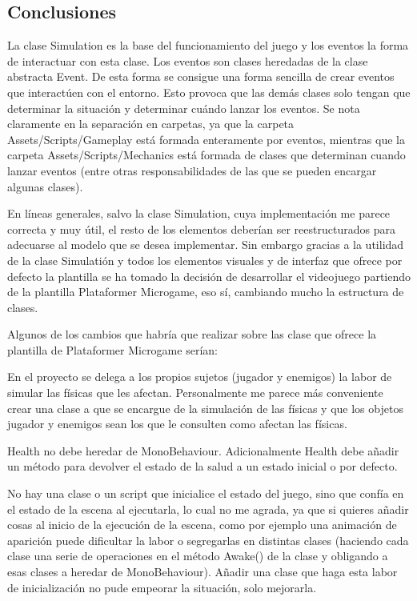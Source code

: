 \subsection{Conclusiones}
La clase Simulation es la base del funcionamiento del juego y los eventos la forma de interactuar con esta clase. Los eventos son clases heredadas de la clase abstracta Event. De esta forma se consigue una forma sencilla de crear eventos que interactúen con el entorno. Esto provoca que las demás clases solo tengan que determinar la situación y determinar cuándo lanzar los eventos. Se nota claramente en la separación en carpetas, ya que la carpeta Assets/Scripts/Gameplay está formada enteramente por eventos, mientras que la carpeta Assets/Scripts/Mechanics está formada de clases que determinan cuando lanzar eventos (entre otras responsabilidades de las que se pueden encargar algunas clases).

En líneas generales, salvo la clase Simulation, cuya implementación me parece correcta y muy útil, el resto de los elementos deberían ser reestructurados para adecuarse al modelo que se desea implementar. Sin embargo gracias a la utilidad de la clase Simulatión y todos los elementos visuales y de interfaz que ofrece por defecto la plantilla se ha tomado la decisión de desarrollar el videojuego partiendo de la plantilla Plataformer Microgame, eso sí, cambiando mucho la estructura de clases.

Algunos de los cambios que habría que realizar sobre las clase que ofrece la plantilla de Plataformer Microgame serían:

En el proyecto se delega a los propios sujetos (jugador y enemigos) la labor de simular las físicas que les afectan. Personalmente me parece más conveniente crear una clase a que se encargue de la simulación de las físicas y que los objetos jugador y enemigos sean los que le consulten como afectan las físicas. 

Health no debe heredar de MonoBehaviour. Adicionalmente Health debe añadir un método para devolver el estado de la salud a un estado inicial o por defecto. 

No hay una clase o un script que inicialice el estado del juego, sino que confía en el estado de la escena al ejecutarla, lo cual no me agrada, ya que si quieres añadir cosas al inicio de la ejecución de la escena, como por ejemplo una animación de aparición puede dificultar la labor o segregarlas en distintas clases (haciendo cada clase una serie de operaciones en el método Awake() de la clase y obligando a esas clases a heredar de MonoBehaviour). Añadir una clase que haga esta labor de inicialización no pude empeorar la situación, solo mejorarla. 


